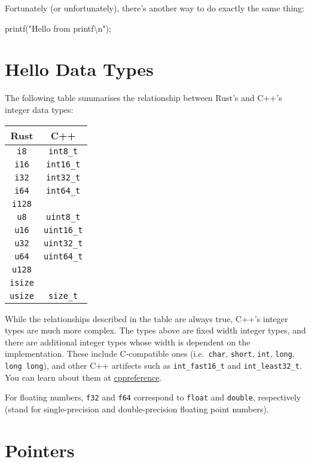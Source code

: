 \documentclass[
]{book}
\newenvironment{Shaded}{\begin{snugshade}}{\end{snugshade}}
\newcommand{\NormalTok}[1]{#1}
\newcommand{\SpecialCharTok}[1]{\textcolor[rgb]{0.00,0.00,0.00}{#1}}
\newcommand{\StringTok}[1]{\textcolor[rgb]{0.31,0.60,0.02}{#1}}
\begin{document}
Fortunately (or unfortunately), there's another way to do exactly the same thing:

\begin{Shaded}
\begin{Highlighting}[]
\NormalTok{printf(}\StringTok{"Hello from printf}\SpecialCharTok{\textbackslash{}n}\StringTok{"}\NormalTok{);}
\end{Highlighting}
\end{Shaded}

\hypertarget{hello-data-types}{%
\section{Hello Data Types}\label{hello-data-types}}

The following table summarises the relationship between Rust's and C++'s integer data types:

\begin{longtable}[]{@{}cc@{}}
\toprule
Rust & C++\tabularnewline
\midrule
\endhead
\texttt{i8} & \texttt{int8\_t}\tabularnewline
\texttt{i16} & \texttt{int16\_t}\tabularnewline
\texttt{i32} & \texttt{int32\_t}\tabularnewline
\texttt{i64} & \texttt{int64\_t}\tabularnewline
\texttt{i128} &\tabularnewline
\texttt{u8} & \texttt{uint8\_t}\tabularnewline
\texttt{u16} & \texttt{uint16\_t}\tabularnewline
\texttt{u32} & \texttt{uint32\_t}\tabularnewline
\texttt{u64} & \texttt{uint64\_t}\tabularnewline
\texttt{u128} &\tabularnewline
\texttt{isize} &\tabularnewline
\texttt{usize} & \texttt{size\_t}\tabularnewline
\bottomrule
\end{longtable}

While the relationships described in the table are always true, C++'s integer types are much more complex. The types above are fixed width integer types, and there are additional integer types whose width is dependent on the implementation. These include C-compatible ones (i.e.~\texttt{char}, \texttt{short}, \texttt{int}, \texttt{long}, \texttt{long\ long}), and other C++ artifects such as \texttt{int\_fast16\_t} and \texttt{int\_least32\_t}. You can learn about them at \href{https://en.cppreference.com/w/cpp/types/integer}{cppreference}.

For floating numbers, \texttt{f32} and \texttt{f64} correspond to \texttt{float} and \texttt{double}, respectively (stand for single-precision and double-precision floating point numbers).

\hypertarget{pointers}{%
\section{Pointers}\label{pointers}}
\end{document}
